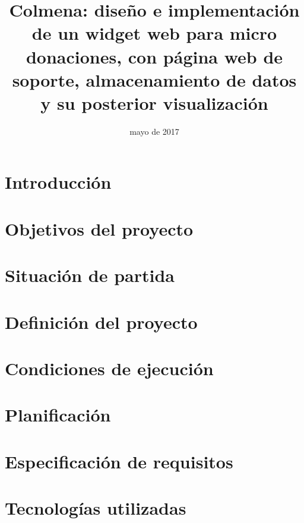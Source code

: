 \documentclass{memoriaPFC}
\title{Colmena: diseño e implementación de un widget web para micro donaciones, con página web de soporte, almacenamiento de datos y su posterior visualización}
\date{mayo de 2017}
\begin{document}
\frontmatter
\hacerportada
\hacerresumen
\tableofcontents
\listoffigures %
\listoftables %

\mainmatter
\chapter{Introducción}



\chapter{Objetivos del proyecto}



\chapter{Situación de partida}



\chapter{Definición del proyecto}



\chapter{Condiciones de ejecución}



\chapter{Planificación}



\chapter{Especificación de requisitos}



\chapter{Tecnologías utilizadas}


\backmatter
\appendix

%

\end{document}
